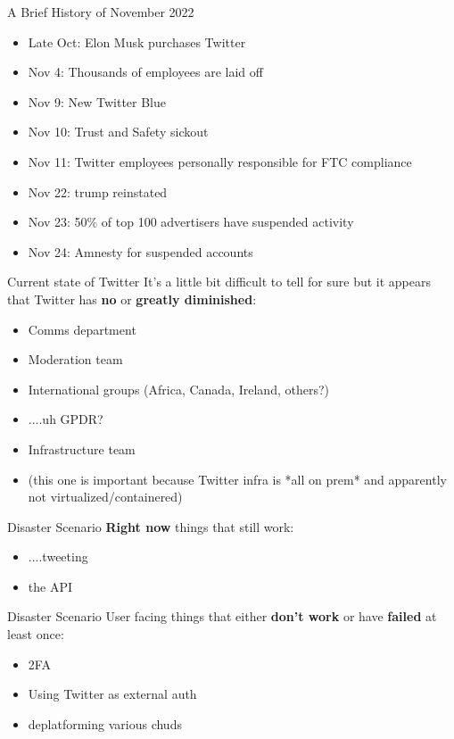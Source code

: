 \documentclass{beamer}
\begin{document}
\begin{frame}{A Brief History of November 2022}
	\begin{itemize}
	\item Late Oct: Elon Musk purchases Twitter
	\item Nov 4: Thousands of employees are laid off
	\item Nov 9: New Twitter Blue
	\pause
	\item Nov 10: Trust and Safety sickout
	\pause
	\item Nov 11: Twitter employees personally responsible for FTC compliance
	\pause
	\item Nov 22: trump reinstated
	\pause
	\item Nov 23: 50\% of top 100 advertisers have suspended activity
	\pause
	\item Nov 24: Amnesty for suspended accounts	
	
	\end{itemize}
\end{frame}

\begin{frame}{Current state of Twitter}
	It's a little bit difficult to tell for sure but it appears that Twitter has \textbf{no} or \textbf{greatly diminished}:
	\begin{itemize}
		\pause
		\item Comms department
		\pause
		\item Moderation team
		\pause
		\item International groups (Africa, Canada, Ireland, others?)
		\pause
		\item ....uh GPDR? 
		\pause 
		\item Infrastructure team 
		\pause
		\item (this one is important because Twitter infra is *all on prem* and apparently not virtualized/containered)
	\end{itemize}
\end{frame}

\begin{frame}{Disaster Scenario}
	\textbf{Right now} things that still work:
	\begin{itemize}
		\pause
		\item ....tweeting
		\pause
		\item the API
		\pause
	\end{itemize}
\end{frame}

\begin{frame}{Disaster Scenario}
	User facing things that either \textbf{don't work} or have \textbf{failed} at least once:
	\begin{itemize}
		\pause
		\item 2FA
		\pause
		\item Using Twitter as external auth
		\pause
		\item deplatforming various chuds
	\end{itemize}
\end{frame}
\end{document}

